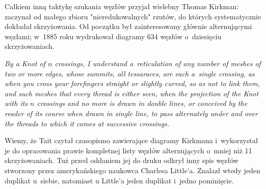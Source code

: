 Całkiem inną taktykę szukania węzłów przyjał wielebny Thomas Kirkman: zaczynał od małego zbioru "nieredukowalnych" rzutów, do których systematycznie dokładał skrzyżowania.
%
Od początku był zainteresowany głównie alternującymi węzłami; w~1885 roku wydrukował diagramy 634 węzłów o~dziesięciu skrzyżowaniach.

\begin{definition}
    \emph{By a Knot of $n$ crossings, I understand a~reticulation of any number of meshes of two or more edges, whose summits, all tessaraces, are each a~single crossing, as when you cross your forefingers straight or slightly curved, so as not to link them, and such meshes that every thread is either seen, when the projection of the Knot with its $n$ crossings and no more is drawn in double lines, or conceived by the reader of its course when drawn in single line, to pass alternately under and over the threads to which it comes at successive crossings.}
\end{definition}

Wiemy, że Tait czytał czasopismo zawierające diagramy Kirkmana i~wykorzystał je do opracowania prawie kompletnej listy węzłów alternujących o~mniej niż 11 skrzyżowaniach.
Tuż przed oddaniem jej do druku odkrył inny spis węzłów stworzony przez amerykańskiego naukowca Charlesa Little'a.
%
Znalazł wtedy jeden duplikat u~siebie, natomiast u Little'a jeden duplikat i~jedno pominięcie.
